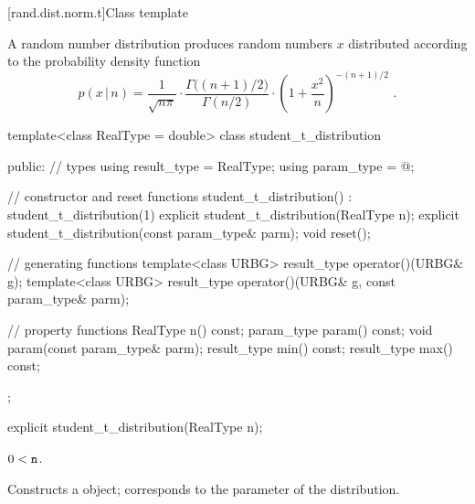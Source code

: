 
[rand.dist.norm.t]{Class template }%
%
%

\pnum
A  random number distribution
produces random numbers $x$
distributed according to
the probability density function%
%
%
\[ p(x\,|\,n) = \frac{1}{\sqrt{n \pi}}
     \cdot \frac{\Gamma\big((n+1)/2\big)}{\Gamma(n/2)}
     \cdot \left(1 + \frac{x^2}{n} \right)^{-(n+1)/2}
     \text{ .} \]

%
\begin{codeblock}
template<class RealType = double>
  class student_t_distribution {
  public:
    // types
    using result_type = RealType;
    using param_type  = @\unspec@;

    // constructor and reset functions
    student_t_distribution() : student_t_distribution(1) {}
    explicit student_t_distribution(RealType n);
    explicit student_t_distribution(const param_type& parm);
    void reset();

    // generating functions
    template<class URBG>
      result_type operator()(URBG& g);
    template<class URBG>
      result_type operator()(URBG& g, const param_type& parm);

    // property functions
    RealType n() const;
    param_type param() const;
    void param(const param_type& parm);
    result_type min() const;
    result_type max() const;
  };
\end{codeblock}


%
\begin{itemdecl}
explicit student_t_distribution(RealType n);
\end{itemdecl}

\begin{itemdescr}
\pnum
\requires $0 < \texttt{n}$.

\pnum
\effects Constructs a  object;
 corresponds to the parameter of the distribution.
\end{itemdescr}

